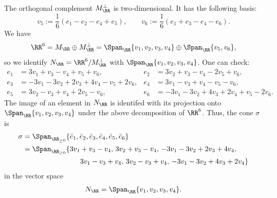 \documentclass[12pt]{amsart}
\theoremstyle{plain}
\theoremstyle{definition}
\begin{document}
The orthogonal complement $M_\RR^\perp$ is two-dimensional.
It has the following basis:
$$v_5 :=\frac{1}{6}(e_1-e_2-e_4+e_5), \qquad v_6 := \frac{1}{6} (e_1 + e_3 -e_4 - e_6).$$
We have
$$\RR^6 = M_\RR \oplus M_\RR^\perp = \Span_\RR\{v_1, v_2, v_3, v_4\} \oplus \Span_{\RR}\{v_5, v_6\},$$
so we identify $N_\RR = \RR^6 / M_\RR^\perp$ with $\Span_\RR\{v_1, v_2, v_3, v_4\}$.
One can check:
\begin{align*}
	e_1 &= 3v_1 + v_3 - v_4 +v_5+v_6, & e_2 &= 3v_2+v_3-v_4-2v_5+v_6,  \\
	e_3 &= -3v_1-3v_2+2v_3+4v_4-v_5+2v_6,  & e_4 &= 3v_1-v_3+v_4-v_5-v_6, \\
	e_5 &= 3v_2-v_3+v_4+2v_5-v_6, & e_6 &= -3v_1-3v_2+4v_3+2v_4+v_5-2v_6.
\end{align*}
The image of an element in $N_\RR$ is identifed with its projection onto $\Span_\RR\{v_1, v_2, v_3, v_4\}$ under the above decomposition of $\RR^6$.
Thus, the cone $\sigma$ is
\begin{align*}
	\sigma &= \Span_{\RR_{\ge 0}}\{ \bar e_1, \bar e_2, \bar e_3, \bar e_4, \bar e_5, \bar e_6 \} \\
		&= \Span_{\RR_{\ge 0}} \{3v_1 + v_3 - v_4,\,  3v_2+v_3-v_4,\,  -3v_1-3v_2+2v_3+4v_4, \\
		&\qquad\qquad\qquad\qquad  3v_1-v_3+v_4,\,   3v_2-v_3+v_4, \, -3v_1-3v_2+4v_3+2v_4 \}
\end{align*}
in the vector space
$$N_\RR = \Span_\RR\{v_1, v_2, v_3 , v_4\}.$$
\end{document}
